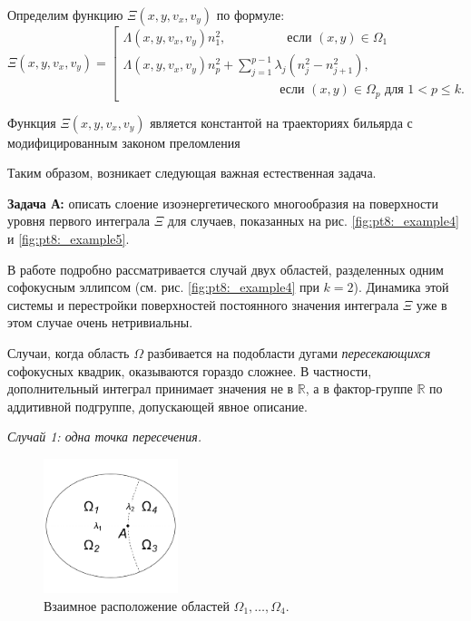 Определим функцию $\Xi(x, y, v_x, v_y)$ по формуле: 
\begin{equation*}
\Xi(x, y, v_x, v_y) = \left[
\begin{array}{ll}
    \Lambda(x, y, v_x, v_y) n_1^2, \qquad  \ \ \qquad   \text{ если } (x,y) \in \Omega_1 
    \\
    \Lambda(x, y, v_x, v_y) n_p^2 + \sum_{j=1}^{p-1} \lambda_j(n_j^2-n_{j+1}^2), \\
     \qquad \qquad \qquad \qquad \qquad \qquad  \text{ если } (x,y) \in \Omega_p \text{ для } 1 < p \leq k. 
\end{array}
\right.
\end{equation*}

\begin{theorem}
Функция $\Xi(x, y, v_x, v_y)$ является константой на траекториях бильярда с модифицированным законом  преломления
\end{theorem}

Таким образом, возникает следующая важная естественная задача.

\textbf{Задача А:} описать слоение изоэнергетического многообразия на поверхности уровня первого интеграла $\Xi$ для случаев, показанных на рис. \ref{fig:pt8:_example4} и \ref{fig:pt8:_example5}. 

В работе подробно рассматривается случай двух областей, разделенных одним софокусным эллипсом (см. рис. \ref{fig:pt8:_example4} при $k=2$). Динамика этой системы и перестройки поверхностей постоянного значения интеграла $\Xi$ уже в этом случае очень нетривиальны.
\bigskip

Случаи, когда область $\Omega$ разбивается на подобласти дугами \textit{пересекающихся} софокусных квадрик, оказываются гораздо сложнее. В частности, дополнительный интеграл принимает значения не в $\mathbb{R}$, а в фактор-группе $\mathbb{R}$ по  аддитивной подгруппе, допускающей явное описание.


{\it Случай 1: одна точка пересечения. }

\begin{figure}[!htb]
\centering
     \includegraphics[width=0.35\textwidth]{images/section1/img2.pdf}
\caption{Взаимное расположение областей $\Omega_1,\ldots,\Omega_4$.}
    \label{fig:pt8:_example6}
\end{figure}

